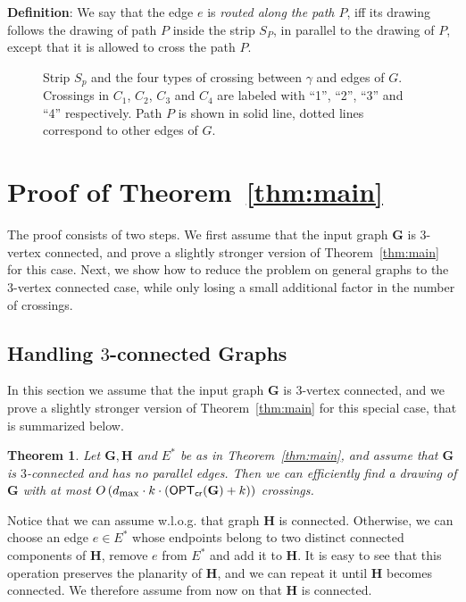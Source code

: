 \documentclass[twoside,leqno,twocolumn]{article}
\newtheorem{theorem}{Theorem}
\newenvironment{Definition}{{\bf Definition}: }{}
\newcommand{\optcro}[1]{\mathsf{OPT}_{\mathsf{cr}}(#1)}
\newcommand{\dmax}{d_{\mbox{\textup{\footnotesize{max}}}}}
\newcommand{\G}{{\mathbf{G}}}
\renewcommand{\H}{{\mathbf{H}}}
\begin{document}
\begin{Definition}
We say that the edge $e$ is \emph{routed along the path $P$}, 
iff its drawing follows the drawing of path $P$ inside the strip $S_P$, in parallel to the drawing of $P$, 
except that it is allowed to cross the path $P$. 
\end{Definition}


\begin{figure}
\begin{center}
\caption{Strip $S_p$ and the four types of crossing between $\gamma$ and edges of $G$. Crossings in $C_1$, $C_2$, $C_3$ and $C_4$ are labeled with ``1'', ``2'', ``3'' and ``4'' respectively. Path $P$ is shown in solid line, dotted lines correspond to other edges of $G$.}
\label{crossings-c1-c2-c3}
\end{center}
\end{figure}




\section{Proof of Theorem~\ref{thm:main}}\label{sec:alg}
The proof consists of two steps. We first assume that the input graph $\G$ is $3$-vertex connected, and prove a slightly stronger version of Theorem~\ref{thm:main} for this case. Next, we show how to reduce the problem on general graphs to the $3$-vertex connected case, while only losing a small additional factor in the number of crossings.

\subsection{Handling $3$-connected Graphs}
In this section we assume that the input graph $\G$ is $3$-vertex connected, and we prove a slightly stronger version of Theorem~\ref{thm:main} for this special case, that is summarized below. 

\begin{theorem}\label{thm:main2}
Let $\G,\H$ and $E^*$ be as in Theorem~\ref{thm:main}, and assume that $\G$ is $3$-connected and has no parallel edges.
 Then we can efficiently find a drawing of $\G$ with at most $O\left(\dmax \cdot k\cdot (\optcro{\G}+k)\right )$ crossings.
\end{theorem}



Notice that we can assume w.l.o.g. that graph $\H$ is connected. Otherwise, we can choose an edge $e\in E^*$ whose endpoints belong to two distinct connected components of $\H$, remove $e$ from $E^*$ and add it to $\H$. It is easy to see that this operation preserves the planarity of $\H$, and we can repeat it until $\H$ becomes connected. We therefore assume from now on that $\H$ is connected.
\end{document}
